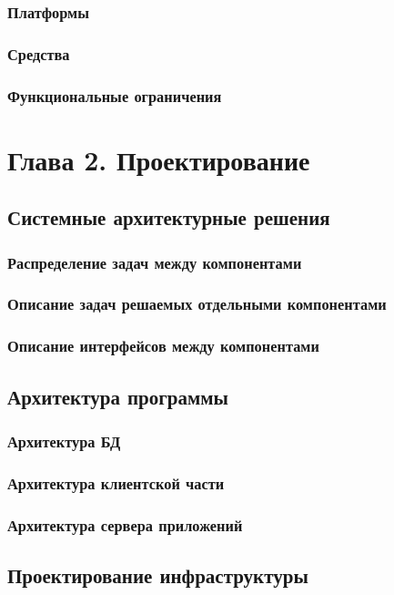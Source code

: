 \documentclass[utf8,usehyperref,12pt]{G7-32}
\begin{document}
\subsection{Платформы}
\subsection{Средства}
\subsection{Функциональные ограничения}


\chapter{Глава 2. Проектирование}
\section{Системные архитектурные решения}
\subsection{Распределение задач между компонентами}
\subsection{Описание задач решаемых отдельными компонентами}
\subsection{Описание интерфейсов между компонентами}

\section{Архитектура программы}
\subsection{Архитектура БД}
\subsection{Архитектура клиентской части}
\subsection{Архитектура сервера приложений}
\section{Проектирование инфраструктуры}
\end{document}
